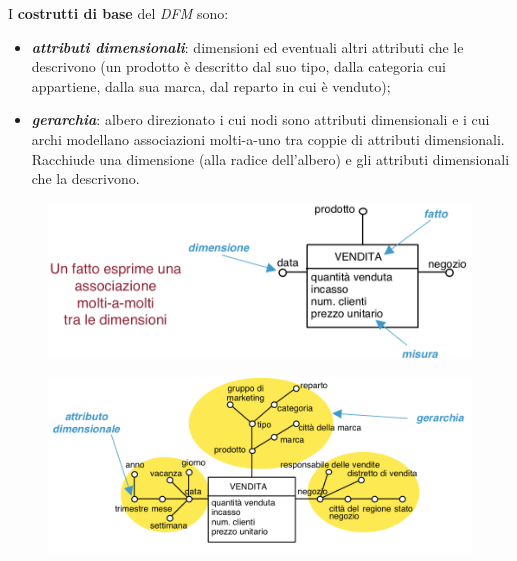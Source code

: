 \documentclass[a4paper, notitlepage, 9pt]{extreport}
\begin{document}
I \textbf{costrutti di base} del \textit{DFM} sono:
\begin{itemize}
	\item \textit{\textbf{attributi dimensionali}}: dimensioni ed eventuali altri attributi che le descrivono (un prodotto è descritto dal suo tipo, dalla categoria cui appartiene, dalla sua marca, dal reparto in cui è venduto);
	\item \textit{\textbf{gerarchia}}: albero direzionato i cui nodi sono attributi dimensionali e i cui archi modellano associazioni molti-a-uno tra coppie di attributi dimensionali. Racchiude una dimensione (alla radice dell’albero) e gli attributi dimensionali che la descrivono.
\end{itemize}
\begin{multicols}{2}
	\begin{figure}[H]
		\centering
		\includegraphics[scale=0.38]{DFM}
	\end{figure}
	\columnbreak
	\begin{figure}[H]
		\centering
		\includegraphics[scale=0.38]{DFM2}
	\end{figure}
\end{multicols}
\end{document}
